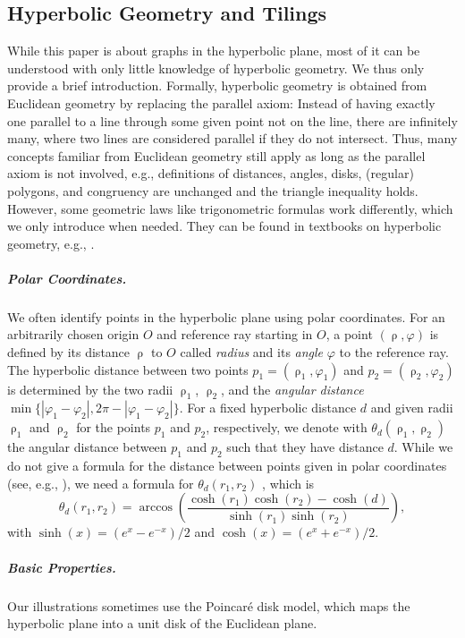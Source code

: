 \documentclass[11pt]{article}
\renewcommand{\phi}{\varphi}
\DeclareMathOperator{\rad}{\rho}
\begin{document}
\subsection{Hyperbolic Geometry and Tilings}
%
While this paper is about graphs in the hyperbolic plane, most of it can be understood with only little knowledge of hyperbolic geometry.
We thus only provide a brief introduction.
Formally, hyperbolic geometry is obtained from Euclidean geometry by replacing the parallel axiom: Instead of having exactly one parallel to a line through some given point not on the line, there are infinitely many, where two lines are considered parallel if they do not intersect.
Thus, many concepts familiar from Euclidean geometry still apply as long as the parallel axiom is not involved, e.g., definitions of distances, angles, disks, (regular) polygons, and congruency are unchanged and the triangle inequality holds.
However, some geometric laws like trigonometric formulas work differently,
which we only introduce when needed.
They can be found in textbooks on hyperbolic geometry, e.g., \cite{Euclid_Non_Euclid_Geomet-Green93}.
%
\subparagraph{Polar Coordinates.}
%
We often identify points in the hyperbolic plane using polar coordinates.
For an arbitrarily chosen origin $O$ and reference ray starting in $O$, a point $(\rad, \varphi)$ is defined by its distance $\rad$ to $O$ called \emph{radius} and its \emph{angle} $\varphi$ to the reference ray.
The hyperbolic distance between two points $p_1 = (\rad_1, \varphi_1)$ and $p_2 = (\rad_2, \varphi_2)$ is determined by the two radii $\rad_1$, $\rad_2$, and the \emph{angular distance} $\min\{|\phi_1 - \phi_2|, 2 \pi - |\phi_1 - \phi_2|\}$.
For a fixed hyperbolic distance $d$ and given radii $\rad_1$ and $\rad_2$ for the points $p_1$ and $p_2$, respectively, we denote with $\theta_d(\rad_1, \rad_2)$ the angular distance between $p_1$ and $p_2$ such that they have distance $d$.
While we do not give a formula for the distance between points given in polar coordinates (see, e.g., \cite{blasius_strongly_2023}), we need a formula for $\theta_d(r_1, r_2)$ , which is
%
\begin{equation}
    \label{eq:max_angular_distance}
    \theta_d(r_1,r_2) = \arccos\left(\frac{\cosh(r_1)\cosh(r_2)-\cosh(d)}{\sinh(r_1)\sinh(r_2)}\right),
\end{equation}
%
with $\sinh(x) = (e^x - e^{-x}) / 2$ and $\cosh(x) = (e^x + e^{-x}) / 2$.
%
\subparagraph{Basic Properties.}
%
Our illustrations sometimes use the Poincaré disk model, which maps the hyperbolic plane into a unit disk of the Euclidean plane.
\end{document}
